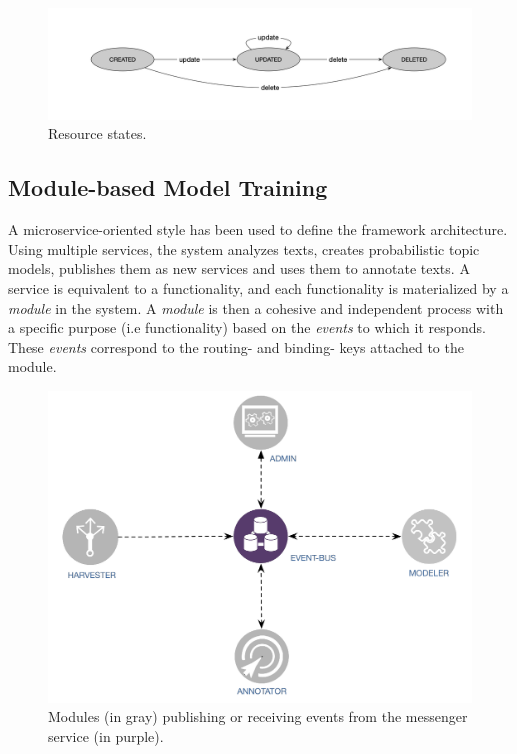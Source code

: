 \begin{figure}
  \center
  \includegraphics[scale=0.3]{resource-states.png}
  \caption{Resource states.}
  \label{fig:librairy-states}
\end{figure}


\subsection{Module-based Model Training}
\label{sec:librairy-modules}

A microservice-oriented style has been used to define the framework architecture. Using multiple services, the system analyzes texts, creates probabilistic topic models, publishes them as new services and uses them to annotate texts. A service is equivalent to a functionality, and each functionality is materialized by a \textit{module} in the system. A \textit{module} is then a cohesive and independent process \citep{Dragoni2016} with a specific purpose (i.e functionality) based on the \textit{events} to which it responds. These \textit{events} correspond to the routing- and binding- keys attached to the module.

\begin{figure} 
  \center
  \includegraphics[scale=0.45]{modulesBN}
  \caption{Modules (in gray) publishing or receiving events from the messenger service (in purple).}
  \label{fig:librairy-modules}
\end{figure}


